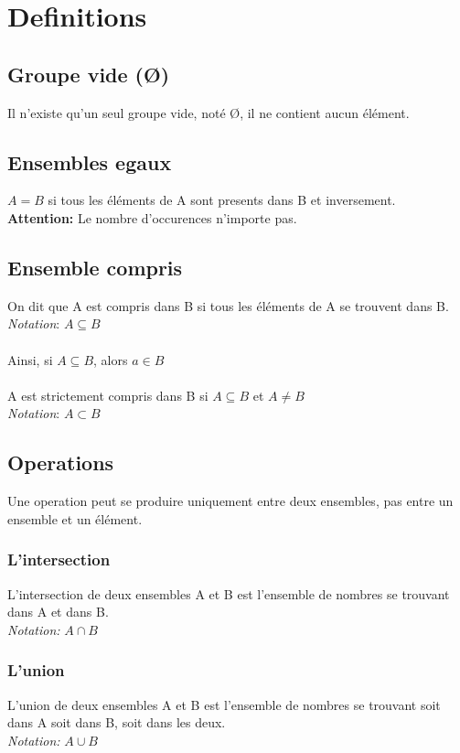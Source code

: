 \documentclass[12pt]{article}
\begin{document}
  
\section{Definitions}
  
\subsection{Groupe vide (\O)}
Il n'existe qu'un seul groupe vide, noté \O, il ne contient aucun élément.

\subsection{Ensembles egaux}
$A = B$ si tous les éléments de A sont presents dans B et inversement.  \\
\textbf{Attention:} Le nombre d'occurences n'importe pas.
 
\subsection{Ensemble compris}
On dit que A est compris dans B si tous les éléments de A se trouvent dans B.\\
{\em Notation}: $A \subseteq B$\\
\\
Ainsi, si $A \subseteq B$, alors $a \in B$ \\
\\
A est strictement compris dans B si $A \subseteq B$ et $A \neq B$\\
{\em Notation}: $A \subset B$\\

\subsection{Operations}
Une operation peut se produire uniquement entre deux ensembles, pas entre un ensemble et un élément.
\subsubsection{L'intersection}
L'intersection de deux ensembles A et B est l'ensemble de nombres se trouvant dans A et dans B.\\
{\em Notation:} $A \cap B$

\subsubsection{L'union}
L'union de deux ensembles A et B est l'ensemble de nombres se trouvant soit dans A soit dans B, soit dans les deux.\\
{\em Notation:} $A \cup B$
\end{document}
